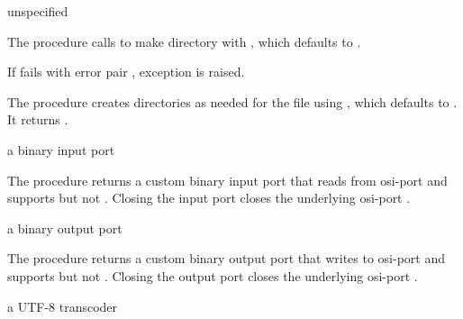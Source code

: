 \begin{procedure}
\end{procedure}
\returns{} unspecified

The  procedure calls 
to make directory  with , which defaults to
.

If  fails with error pair , exception  is raised.

\begin{procedure}
\end{procedure}
\returns{} 

The  procedure creates directories as needed
for the file  using , which defaults to
. It returns .

\begin{procedure}
\end{procedure}
\returns{} a binary input port

The  procedure returns a custom binary input
port that reads from osi-port  and supports
 but not . Closing the
input port closes the underlying osi-port .

\begin{procedure}
\end{procedure}
\returns{} a binary output port

The  procedure returns a custom binary
output port that writes to osi-port  and supports
 but not . Closing the
output port closes the underlying osi-port .

\begin{procedure}
\end{procedure}
\returns{} a UTF-8 transcoder

